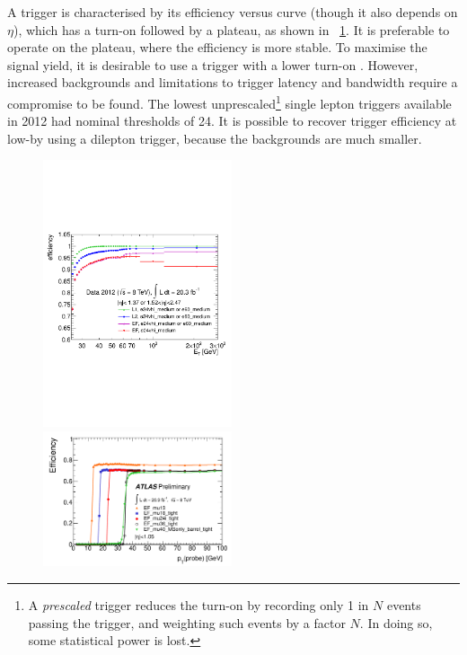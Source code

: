 A trigger is characterised by its efficiency versus \pt curve (though it also depends on 
$\eta$), which has a turn-on followed by a plateau, as shown in 
\Figure~\ref{fig:sel:trig_eff}. It is preferable to operate on the plateau, where the 
efficiency is more stable. To maximise the signal yield, it is desirable to use a trigger 
with a lower turn-on \pt. However, increased backgrounds and limitations to trigger 
latency and bandwidth require a compromise to be found. The lowest unprescaled\footnote{
	A \textit{prescaled} trigger reduces the turn-on \pt by recording only 1 in $N$ 
	events passing the trigger, and weighting such events by a factor $N$. In doing so, 
	some statistical power is lost.
}
single lepton triggers available in 2012 had nominal \pt thresholds of \unit{24}{\GeV}. 
It is possible to recover trigger efficiency at low-\pt by using a dilepton trigger, 
because the backgrounds are much smaller.

\begin{figure}
	\includegraphics[width=0.495\textwidth]{tex/selection/trigger_eff_el}
	\hfill
	\includegraphics[width=0.495\textwidth]{tex/selection/trigger_eff_mu}
	\caption{}
	\label{fig:sel:trig_eff}
\end{figure}

